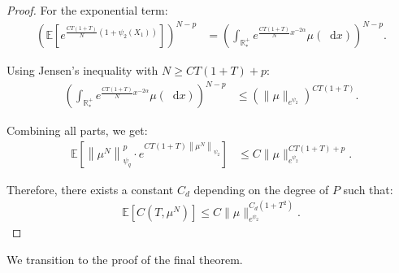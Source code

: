 \documentclass[11pt,a4paper]{article}
\newcommand{\RRP}{\mathbb{R}^+_*}
\newcommand{\E}[1]{\mathbb{E}\left[#1\right]}
\newcommand{\dd}{\mathop{}\!\mathrm{d}}
\begin{document}
\begin{proof}
    For the exponential term:
    \begin{align*}
        \left(\E{e^{\frac{C T(1 + T)}{N}(1 + \psi_2(X_1))}}\right)^{N-p} 
        &= \left(\int_{\RRP} e^{\frac{C T(1 + T)}{N} x^{-2\alpha}} \mu(\dd x) \right)^{N - p}.
    \end{align*}

    Using Jensen’s inequality with $N \geq C T(1 + T) + p$:
    \begin{align*}
        \left(\int_{\RRP} e^{\frac{C T(1 + T)}{N} x^{-2\alpha}} \mu(\dd x)\right)^{N - p} 
        &\leq \left(\|\mu\|_{e^{\psi_2}}\right)^{C T(1 + T)}.
    \end{align*}

    Combining all parts, we get:
    \begin{align*}
        \E{\left\|\mu^N\right\|_{\psi_q}^p \cdot e^{C T(1 + T)\left\|\mu^N\right\|_{\psi_2}}} 
        &\leq C \|\mu\|_{e^{\psi_2}}^{C T(1 + T) + p}.
    \end{align*}

    Therefore, there exists a constant $C_d$ depending on the degree of $P$ such that:
    \begin{align*}
        \E{C(T,\mu^N)} \leq C \|\mu\|_{e^{\psi_2}}^{C_d(1 + T^2)}.
    \end{align*}
\end{proof}
We transition to the proof of the final theorem.
\end{document}
